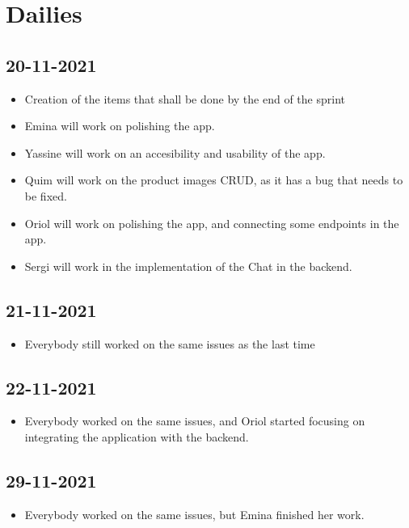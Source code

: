 \documentclass[./main.tex]{subfiles}
\begin{document}
\section{Dailies}

\subsection{20-11-2021}
\begin{itemize}
	\item Creation of the items that shall be done by the end of the sprint
	\item Emina will work on polishing the app.
	\item Yassine will work on an accesibility and usability of the app.
	\item Quim will work on the product images CRUD, as it has a bug that needs to be fixed.
	\item Oriol will work on polishing the app, and connecting some endpoints in the app.
	\item Sergi will work in the implementation of the Chat in the backend.
\end{itemize}

\subsection{21-11-2021}
\begin{itemize}
	\item Everybody still worked on the same issues as the last time
\end{itemize}

\subsection{22-11-2021}
\begin{itemize}
\item Everybody worked on the same issues, and Oriol started focusing on integrating the application with the backend.
\end{itemize}

\subsection{29-11-2021}
\begin{itemize}
	\item Everybody worked on the same issues, but Emina finished her work.
\end{itemize}
\end{document}
